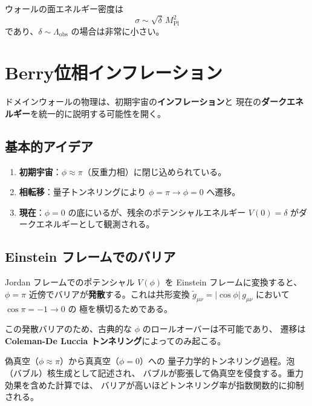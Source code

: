 ウォールの面エネルギー密度は
\[
  \sigma \sim \sqrt{\delta}\, M_{\mathrm{Pl}}^2
\]
であり、$\delta \sim \Lambda_{\mathrm{obs}}$ の場合は非常に小さい。

\section{Berry位相インフレーション}
\label{sec:13.2}

ドメインウォールの物理は、初期宇宙の\textbf{インフレーション}と
現在の\textbf{ダークエネルギー}を統一的に説明する可能性を開く。

\subsection{基本的アイデア}

\begin{enumerate}[label=(\arabic*)]
  \item \textbf{初期宇宙}：$\phi \approx \pi$（反重力相）に閉じ込められている。
  \item \textbf{相転移}：量子トンネリングにより $\phi = \pi \to \phi = 0$ へ遷移。
  \item \textbf{現在}：$\phi = 0$ の底にいるが、残余のポテンシャルエネルギー $V(0) = \delta$ がダークエネルギーとして観測される。
\end{enumerate}

\subsection{Einstein フレームでのバリア}

Jordan フレームでのポテンシャル $V(\phi)$ を Einstein フレームに変換すると、
$\phi = \pi$ 近傍でバリアが\textbf{発散}する。これは共形変換
$\tilde{g}_{\mu\nu} = |\cos\phi|\, g_{\mu\nu}$ において $\cos\pi = -1 \to 0$ の
極を横切るためである。

この発散バリアのため、古典的な $\phi$ のロールオーバーは不可能であり、
遷移は\textbf{Coleman-De Luccia トンネリング}によってのみ起こる。

\begin{dfnbox}
偽真空（$\phi \approx \pi$）から真真空（$\phi = 0$）への
量子力学的トンネリング過程。泡（バブル）核生成として記述され、
バブルが膨張して偽真空を侵食する。重力効果を含めた計算では、
バリアが高いほどトンネリング率が指数関数的に抑制される。
\end{dfnbox}

